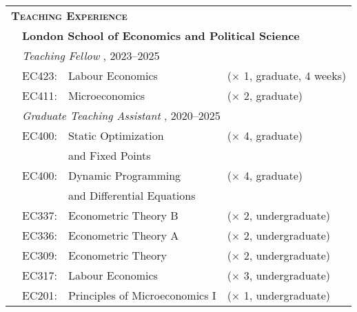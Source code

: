 \begin{tabular}{llll}
	
	\multicolumn{3}{l}{
		\large
		\textbf{%
			\textsc{%
				Teaching Experience
			}
		}
	}
	\\[2ex]
	
	\indent
	&
	\multicolumn{3}{l}{
		\textbf{%
			London School of Economics and Political Science
		}
	}
	\\[1.5ex]
	
	&
	\multicolumn{3}{l}{
		\textit{%
			Teaching Fellow%
		}%
		,
		2023--2025
	}
	\\[.5ex]
	
	& EC423:
	& Labour Economics
	& ($\times$ 1, graduate, 4 weeks)
	\\
	
	& EC411:
	& Microeconomics
	& ($\times$ 2, graduate)
	\\[1em]
	
	&
	\multicolumn{3}{l}{
		\textit{%
			Graduate Teaching Assistant%
		}%
		,
		2020--2025
	}
	\\[.5ex]
	
	& EC400:
	& Static Optimization
	& ($\times$ 4, graduate)
	\\
	
	& 
	& and Fixed Points
	& 
	\\
	
	& EC400:
	& Dynamic Programming
	& ($\times$ 4, graduate)
	\\
	& 
	& and Differential Equations
	& 
	\\
	
	& EC337:
	& Econometric Theory B
	& ($\times$ 2, undergraduate)
	\\%
	
	& EC336:
	& Econometric Theory A
	& ($\times$ 2, undergraduate)
	\\%
	
	& EC309:
	& Econometric Theory
	& ($\times$ 2, undergraduate)
	\\%
	
	& EC317:
	& Labour Economics
	& ($\times$ 3, undergraduate)
	\\%
	
	& EC201:
	& Principles of Microeconomics I
	& ($\times$ 1, undergraduate)
	\\[1em]

\end{tabular}

